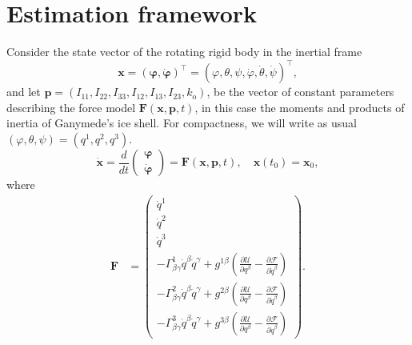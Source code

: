 \documentclass[lineno, pdflatex,sn-mathphys-ay]{sn-jnl}
\theoremstyle{thmstyleone}%
\theoremstyle{thmstyletwo}%
\theoremstyle{thmstylethree}%
\renewcommand{\vec}[1]{\boldsymbol{#1}}
\begin{document}
\section{Estimation framework}\label{sec:DC_laser}
Consider the state vector of the rotating rigid body in the inertial frame
\begin{equation}
	\vec{x} = 
		( \vec{\varphi}, \dot{\vec{\varphi}})^\top = %
		(\varphi,\theta,\psi,\dot{\varphi},\dot{\theta},\dot{\psi}
		)^\top, 
\end{equation}
and let  $\vec{p} = (I_{11}, I_{22}, I_{33}, I_{12}, I_{13}, I_{23}, k_\mathrm{o}) $,
be the  vector of constant parameters describing the force model $ \vec{F}(\vec{x}, \vec{p}, t ) $, in this case the moments and products of inertia of Ganymede's ice shell.
%
For compactness, we will write as usual $(\varphi,\theta,\psi)=(q^1,q^2,q^3)$.
%
\begin{equation}\label{eom}
	\dot{\vec{x} } = \frac{d}{dt}
	\begin{pmatrix}
		\vec{\varphi} \\
		\dot{\vec{\varphi}}
	\end{pmatrix}
	= \vec{F}(\vec{x}, \vec{p}, t ),
	\quad \vec{x}(t_0) = \vec{x}_0,
\end{equation}
where 
\begin{align}
	\vec{F} &= 
	\begin{pmatrix}
	\dot{q}^1 \\ \dot{q}^2 \\ \dot{q}^3 \\
	-{\Gamma}^{1}_{\beta\gamma} \dot{q}^\beta \dot{q}^\gamma 
	+{g}^{1\beta} 
	\left(
	\frac{\partial \mathcal{U}}{\partial q^\beta}
	 - \frac{\partial \mathcal{F}}{\partial \dot{q}^\beta} 
	\right)
	\\%
	-{\Gamma}^{2}_{\beta\gamma} \dot{q}^\beta \dot{q}^\gamma 
	+{g}^{2\beta} 
	\left(
	\frac{\partial \mathcal{U}}{\partial q^\beta} 
	- \frac{\partial \mathcal{F}}{\partial \dot{q}^\beta} 
	\right)
	\\ 
	-{\Gamma}^{3}_{\beta\gamma} \dot{q}^\beta \dot{q}^\gamma 
	+{g}^{3\beta} 
	\left(
	\frac{\partial \mathcal{U}}{\partial q^\beta}
	- \frac{\partial \mathcal{F}}{\partial \dot{q}^\beta} 
	\right)
	\end{pmatrix}.
\end{align}
\end{document}
